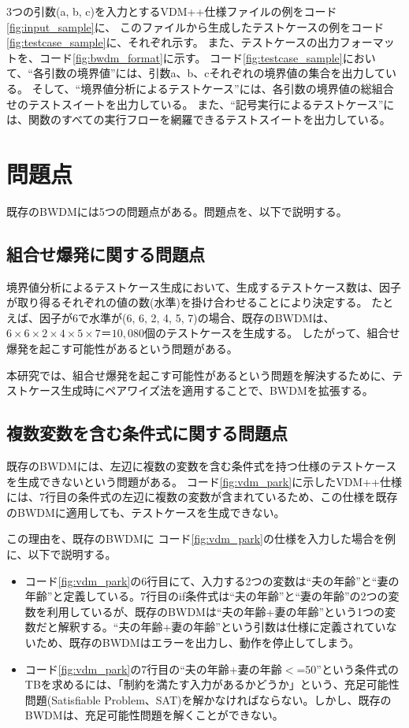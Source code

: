 \documentclass[uplatex, report, a4j, 10pt]{jsbook}
\begin{document}
3つの引数(a, b, c)を入力とするVDM++仕様ファイルの例をコード\ref{fig:input_sample}に、
このファイルから生成したテストケースの例をコード\ref{fig:testcase_sample}に、それぞれ示す。
また、テストケースの出力フォーマットを、コード\ref{fig:bwdm_format}に示す。
コード\ref{fig:testcase_sample}において、``各引数の境界値''には、引数a、b、cそれぞれの境界値の集合を出力している。
そして、``境界値分析によるテストケース''には、各引数の境界値の総組合せのテストスイートを出力している。
また、``記号実行によるテストケース''には、関数のすべての実行フローを網羅できるテストスイートを出力している。

\section{問題点}\label{sec:bwdm_problem}
既存のBWDMには5つの問題点がある。問題点を、以下で説明する。

\subsection{組合せ爆発に関する問題点}\label{sec:problem_pairwise}
境界値分析によるテストケース生成において、生成するテストケース数は、因子が取り得るそれぞれの値の数(水準)を掛け合わせることにより決定する。
たとえば、因子が6で水準が(6, 6, 2, 4, 5, 7)の場合、既存のBWDMは、$6 \times 6 \times 2 \times 4 \times 5 \times 7＝10,080個$のテストケースを生成する。
したがって、組合せ爆発を起こす可能性があるという問題がある。

本研究では、組合せ爆発を起こす可能性があるという問題を解決するために、テストケース生成時にペアワイズ法を適用することで、BWDMを拡張する。

\subsection{複数変数を含む条件式に関する問題点}\label{sec:problem_double_var}

既存のBWDMには、左辺に複数の変数を含む条件式を持つ仕様のテストケースを生成できないという問題がある。
コード\ref{fig:vdm_park}に示したVDM++仕様には、7行目の条件式の左辺に複数の変数が含まれているため、この仕様を既存のBWDMに適用しても、テストケースを生成できない。

この理由を、既存のBWDMに コード\ref{fig:vdm_park}の仕様を入力した場合を例に、以下で説明する。

\begin{itemize}
  \item  コード\ref{fig:vdm_park}の6行目にて、入力する2つの変数は``夫の年齢''と``妻の年齢''と定義している。7行目のif条件式は``夫の年齢''と``妻の年齢''の2つの変数を利用しているが、既存のBWDMは``夫の年齢+妻の年齢''という1つの変数だと解釈する。``夫の年齢+妻の年齢''という引数は仕様に定義されていないため、既存のBWDMはエラーを出力し、動作を停止してしまう。
  \item  コード\ref{fig:vdm_park}の7行目の``夫の年齢+妻の年齢$<$=50''という条件式のTBを求めるには、「制約を満たす入力があるかどうか」という、充足可能性問題(Satisfiable Problem、SAT)\cite{sat}を解かなければならない。しかし、既存のBWDMは、充足可能性問題を解くことができない。
\end{itemize}
\end{document}
